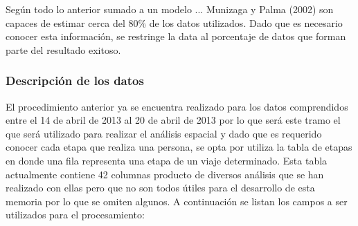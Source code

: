 \documentclass[12pt]{article}
\begin{document}
Según todo lo anterior sumado a un modelo ... Munizaga y Palma (2002)\cite{Procesamiento_datos} son capaces de estimar cerca del 80\% de los datos utilizados. Dado que es necesario conocer esta información, se restringe la data al porcentaje de datos que forman parte del resultado exitoso.


\subsubsection{Descripción de los datos}

El procedimiento anterior ya se encuentra realizado para los datos comprendidos entre el 14 de abril de 2013 al 20 de abril de 2013 por lo que será este tramo el que será utilizado para realizar el análisis espacial y dado que es requerido conocer cada etapa que realiza una persona, se opta por utiliza la tabla de etapas en donde una fila representa una etapa de un viaje determinado. Esta tabla actualmente contiene 42 columnas producto de diversos análisis que se han realizado con ellas pero que no son todos útiles para el desarrollo de esta memoria por lo que se omiten algunos. A continuación se listan los campos a ser utilizados para el procesamiento:
\end{document}

